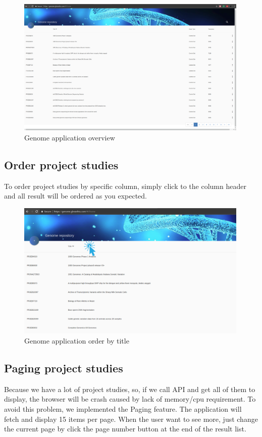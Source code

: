 \documentclass[a4paper,12pt]{article}
\begin{document}
\begin{figure}[H]
\centering
\includegraphics[width=0.99\textwidth]{images/genome-overview}
\caption{Genome application overview}
\end{figure}

\subsection{Order project studies}
To order project studies by specific column, simply click to the column header and all result will be ordered as you expected.

\begin{figure}[H]
\centering
\includegraphics[width=0.99\textwidth]{images/genome-order-2}
\caption{Genome application order by title}
\end{figure}

\subsection{Paging project studies}
Because we have a lot of project studies, so, if we call API and get all of them to display, the browser will be crash caused by lack of memory/cpu requirement. To avoid this problem, we implemented the Paging feature. The application will  fetch and display 15 items per page. When the user want to see more, just change the current page by click the page number button at the end of the result list.
\end{document}
